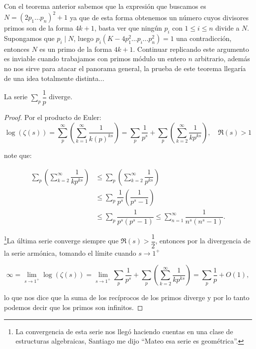 Con el teorema anterior sabemos que la expresión que buscamos es $N=(2p_1\ldots p_n)^2+1$ ya que de esta forma obtenemos un número cuyos divisores primos son de la forma $4k+1$, basta ver que ningún $p_i$ con $1\leq i\leq n$ divide a $N$.\\

Supongamos que $p_i\mid N$, luego $p_i(K-4p_1^2\ldots p_i\ldots p_n^2)=1$ una contradicción, entonces $N$ es un primo de la forma $4k+1$. Continuar replicando este argumento es inviable cuando trabajamos con primos módulo un entero $n$ arbitrario, además no nos sirve para atacar el panorama general, la prueba de este teorema llegaría de una idea totalmente distinta...


\begin{theorem}[Euler]
La serie $\displaystyle\sum_p \dfrac{1}{p}$ diverge.
\end{theorem}

\begin{proof}
Por el producto de Euler:
    $$
\log (\zeta(s))=\sum_p^{\infty}\left(\displaystyle\sum_{k=1}^{\infty} \dfrac{1}{k(p)^{k s}}\right)=\sum_p
\dfrac{1}{p^s}+\sum_{p}\left(\sum_{k=2}^{\infty}\dfrac{1}{kp^{ks}}\right), \quad \Re(s)>1$$

note que:

\begin{align*}
    \sum_{p}\left(\sum_{k=2}^{\infty}\dfrac{1}{kp^{ks}}\right)&\leq \sum_{p}\left(\sum_{k=2}^{\infty}\dfrac{1}{p^{ks}}\right)\\
    &\leq\sum_{p}\dfrac{1}{p^s}\left(\dfrac{1}{p^s-1}\right)\\
    &\leq \sum_{p}\dfrac{1}{p^s(p^s-1)}\leq \sum_{n=1}^{\infty}\dfrac{1}{n^s(n^s-1)}.
\end{align*}

\footnote{La convergencia de esta serie nos llegó haciendo cuentas en una clase de estructuras algebraicas, Santiago me dijo ``Mateo esa serie es geométrica''.}La última serie converge siempre que $\Re(s)>\dfrac{1}{2}$, entonces por la divergencia de la serie armónica, tomando el límite cuando $s\to 1^+$

$$
\infty=\lim_{s\to 1^+}\log(\zeta(s))=\lim_{s\to 1^+}\sum_p
\dfrac{1}{p^s}+\sum_{p}\left(\sum_{k=2}^{\infty}\dfrac{1}{kp^{ks}}\right)=\sum_p
\dfrac{1}{p}+ O(1),$$

lo que nos dice que la suma de los recíprocos de los primos diverge y por lo tanto podemos decir que los primos son infinitos. 
\end{proof}

